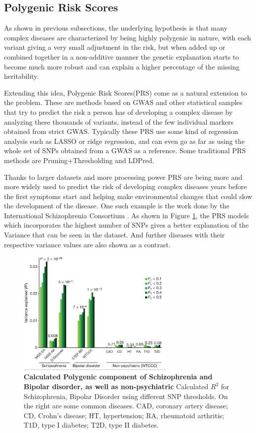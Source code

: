 \clearpage
\subsection{Polygenic Risk Scores}
\label{PRS}
As shown in previous subsections, the underlying hypothesis is that many complex diseases are characterized by being highly polygenic in nature, with each variant giving a very small adjustment in the risk, but when added up or combined together in a non-additive manner the genetic explanation starts to become much more robust and can explain a higher percentage of the missing heritability.

Extending this idea, Polygenic Risk Scores(PRS)\cite{pers} come as a natural extension to the problem. These are methods based on GWAS and other statistical samples that try to predict the risk a person has of developing a complex disease by analyzing these thousands of variants, instead of the few individual markers obtained from strict GWAS. Typically these PRS use some kind of regression analysis such as LASSO or ridge regression, and can even go as far as using the whole set of SNPs obtained from a GWAS as a reference. Some traditional PRS methods are Pruning+Thresholding and LDPred.

Thanks to larger datasets and more processing power PRS are being more and more widely used to predict the risk of developing complex diseases years before the first symptoms start and helping make environmental changes that could slow the development of the disease\cite{Torkamani2018}. One such example is the work done by the International Schizophrenia Consortium\cite{Consortium2009} . As shown in Figure \ref{prs1}, the PRS models which incorporates the highest number of SNPs gives a better explanation of the Variance that can be seen in the dataset. And further diseases with their respective variance values are also shown as a contrast.

\begin{figure}[!ht]
\centerline{\includegraphics[width=3in]{images/background/prs.png}}
\caption{{\bf Calculated Polygenic component of Schizophrenia and Bipolar disorder, as well as non-psychiatric\cite{Consortium2009}} Calculated $R^2$ for Schizophrenia, Bipolar Disorder using different SNP thresholds. On the right are some common diseases. CAD, coronary artery disease; CD, Crohn’s disease; HT,
hypertension; RA, rheumatoid arthritis; T1D, type I diabetes; T2D, type II
diabetes.}
\label{prs1}
\end{figure}


